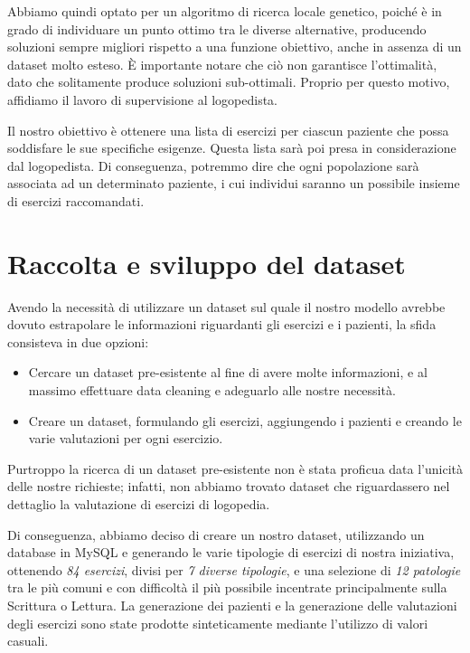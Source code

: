 \documentclass{article}
\begin{document}
    Abbiamo quindi optato per un algoritmo di ricerca locale genetico, poiché è in grado di individuare un punto ottimo tra le diverse alternative, producendo
    soluzioni sempre migliori rispetto a una funzione obiettivo, anche in assenza di un dataset molto esteso. È importante notare che ciò non garantisce l'ottimalità,
    dato che solitamente produce soluzioni sub-ottimali. Proprio per questo motivo, affidiamo il lavoro di supervisione al logopedista.

    Il nostro obiettivo è ottenere una lista di esercizi per ciascun paziente che possa soddisfare le sue specifiche esigenze. Questa lista sarà poi presa in
    considerazione dal logopedista. Di conseguenza, potremmo dire che ogni popolazione sarà associata ad un determinato
    paziente, i cui individui saranno un possibile insieme di esercizi raccomandati.

    \section{Raccolta e sviluppo del dataset}

    Avendo la necessità di utilizzare un dataset sul quale il nostro modello avrebbe dovuto estrapolare le informazioni riguardanti gli esercizi e i pazienti, la sfida consisteva in due opzioni:

    \begin{itemize}
        \item Cercare un dataset pre-esistente al fine di avere molte informazioni, e al massimo effettuare data cleaning e adeguarlo alle nostre necessità.
        \item Creare un dataset, formulando gli esercizi, aggiungendo i pazienti e creando le varie valutazioni per ogni esercizio.
    \end{itemize}

    Purtroppo la ricerca di un dataset pre-esistente non è stata proficua data l'unicità delle nostre richieste; infatti, non abbiamo trovato dataset che riguardassero nel dettaglio la valutazione di esercizi di logopedia.

    Di conseguenza, abbiamo deciso di creare un nostro dataset, utilizzando un database in MySQL e generando le varie tipologie di esercizi di nostra iniziativa, ottenendo \textit{84 esercizi}, divisi per \textit{7 diverse tipologie}, e una selezione di \textit{12 patologie} tra le più comuni e con difficoltà il più possibile incentrate principalmente sulla Scrittura o Lettura. La generazione dei pazienti e la generazione delle valutazioni degli esercizi sono state prodotte sinteticamente mediante l'utilizzo di valori casuali.
\end{document}
